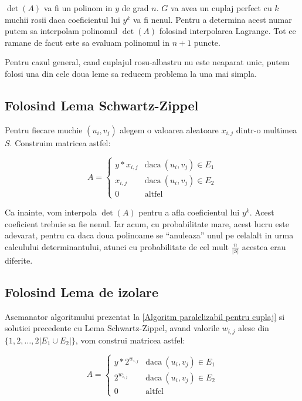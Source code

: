 $\det(A)$ va fi un polinom in $y$ de grad $n$. $G$ va avea un cuplaj perfect cu
$k$ muchii rosii daca coeficientul lui $y^{k}$ va fi nenul. Pentru a determina
acest numar putem sa interpolam polinomul $\det(A)$ folosind interpolarea
Lagrange. Tot ce ramane de facut este sa evaluam polinomul in $n+1$ puncte. \par

Pentru cazul general, cand cuplajul rosu-albastru nu este neaparat unic, putem
folosi una din cele doua leme sa reducem problema la una mai simpla.

\subsection{Folosind Lema Schwartz-Zippel}

Pentru fiecare muchie $(u_{i}, v_{j})$ alegem o valoarea aleatoare $x_{i,j}$ dintr-o
multimea $S$. Construim matricea astfel:

\begin{equation}
  A=
  \begin{cases}
    y * x_{i,j} & \text{daca}\ (u_{i}, v_{j}) \in E_{1} \\
    x_{i,j} & \text{daca}\ (u_{i}, v_{j}) \in E_{2} \\
    0 & \text{altfel}
  \end{cases}
\end{equation}

Ca inainte, vom interpola $\det(A)$ pentru a afla coeficientul lui $y^{k}$.
Acest coeficient trebuie sa fie nenul. Iar acum, cu probabilitate mare, acest
lucru este adevarat, pentru ca daca doua polinoame se ``anuleaza'' unul pe
celalalt in urma calculului determinantului, atunci cu probabilitate de cel mult
$\frac{n}{|S|}$ acestea erau diferite.

\subsection{Folosind Lema de izolare}
Asemanator algoritmului prezentat la \ref{Algoritm paralelizabil pentru cuplaj}
si solutiei precedente cu Lema Schwartz-Zippel, avand valorile $w_{i,j}$ alese
din $\{1, 2, \ldots, 2|E_{1} \cup E_{2}|\}$, vom construi matricea astfel:

\begin{equation}
  A=
  \begin{cases}
    y * 2^{w_{i,j}} & \text{daca}\ (u_{i}, v_{j}) \in E_{1} \\
    2^{w_{i,j}} & \text{daca}\ (u_{i}, v_{j}) \in E_{2} \\
    0 & \text{altfel}
  \end{cases}
\end{equation}

